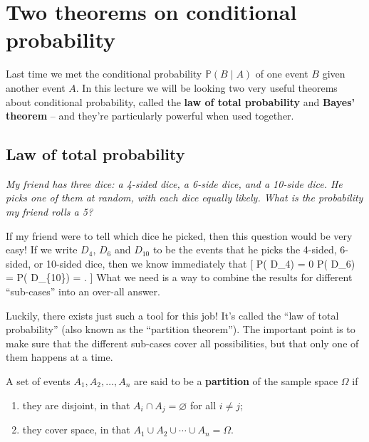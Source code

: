 \documentclass[
  letterpaper,
  DIV=11,
  numbers=noendperiod]{scrreprt}
\providecommand{\tightlist}{%
  \setlength{\itemsep}{0pt}\setlength{\parskip}{0pt}}\usepackage{longtable,booktabs,array}
\theoremstyle{remark}
\begin{document}
\hypertarget{L08-two-theorems}{%
\chapter{Two theorems on conditional
probability}\label{L08-two-theorems}}

Last time we met the conditional probability \(\mathbb P(B \mid A)\) of
one event \(B\) given another event \(A\). In this lecture we will be
looking two very useful theorems about conditional probability, called
the \textbf{law of total probability} and \textbf{Bayes' theorem} -- and
they're particularly powerful when used together.

\hypertarget{total-prob}{%
\section{Law of total probability}\label{total-prob}}

\leavevmode{}%
\emph{My friend has three dice: a 4-sided dice, a 6-side dice, and a
10-side dice. He picks one of them at random, with each dice equally
likely. What is the probability my friend rolls a 5?}

If my friend were to tell which dice he picked, then this question would
be very easy! If we write \(D_4\), \(D_6\) and \(D_{10}\) to be the
events that he picks the 4-sided, 6-sided, or 10-sided dice, then we
know immediately that {[} \mathbb P( \mid D\_4) = 0
\qquad \mathbb P( \mid D\_6) = 
\qquad \mathbb P( \mid D\_\{10\}) =  . {]}
What we need is a way to combine the results for different ``sub-cases''
into an over-all answer.

Luckily, there exists just such a tool for this job! It's called the
``law of total probability'' (also known as the ``partition theorem'').
The important point is to make sure that the different sub-cases cover
all possibilities, but that only one of them happens at a time.

A set of events \(A_1, A_2, \dots, A_n\) are said to be a
\textbf{partition} of the sample space \(\Omega\) if

\begin{enumerate}
\def\labelenumi{\arabic{enumi}.}
\tightlist
\item
  they are disjoint, in that \(A_i \cap A_j = \varnothing\) for all
  \(i \neq j\);
\item
  they cover space, in that
  \(A_1 \cup A_2 \cup \cdots \cup A_n = \Omega\).
\end{enumerate}
\end{document}
